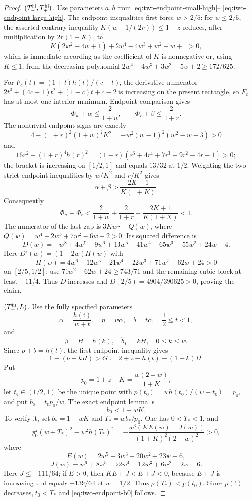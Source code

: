 \begin{proof}
\smallskip\noindent
\emph{$(T_+^{\rm hi},T_+^{\rm hi})$.}
Use parameters $a,b$ from \eqref{eq:two-endpoint-small-high}--
\eqref{eq:two-endpoint-large-high}.  The endpoint inequalities first force
$w>2/5$: for $w\le2/5$, the asserted contrary inequality
$K(w+1/(2r))\le1+z$ reduces, after multiplication by $2r(1+K)$, to
\[
 K(2w^2-4w+1)+2w^4-4w^3+w^2-w+1>0,
\]
which is immediate according as the coefficient of $K$ is nonnegative or,
using $K\le1$, from the decreasing polynomial
$2w^4-4w^3+3w^2-5w+2\ge172/625$.

For $F_c(t)=(1+t)h(t)/(c+t)$, the derivative numerator
$2t^3+(4c-1)t^2+(1-c)t+c-2$ is increasing on the present rectangle, so
$F_c$ has at most one interior minimum.  Endpoint comparison gives
\[
 \Phi_w+\alpha\le\frac2{1+w},\qquad
 \Phi_r+\beta\le\frac2{1+r}.
\]
The nontrivial endpoint signs are exactly
\[
 4-(1+r)^2(1+w)^2K^2
 =-w^2(w-1)^2(w^2-w-3)>0
\]
and
\[
 16r^2-(1+r)^4h(r)^2
 =(1-r)(r^5+4r^4+7r^3+9r^2-4r-1)>0;
\]
the bracket is increasing on $[1/2,1]$ and equals $13/32$ at $1/2$.
Weighting the two strict endpoint inequalities by $w/K^2$ and $r/K^2$
gives
\[
 \alpha+\beta>\frac{2K+1}{K(1+K)}.
\]
Consequently
\[
 \Phi_w+\Phi_r<\frac2{1+w}+\frac2{1+r}
 -\frac{2K+1}{K(1+K)}<1.
\]
The numerator of the last gap is $3Kwr-Q(w)$, where
$Q(w)=w^4-2w^3+7w^2-6w+2>0$.  Its squared difference is
\[
 D(w)=-w^8+4w^7-9w^6+13w^5-41w^4+65w^3-55w^2+24w-4.
\]
Here $D'(w)=(1-2w)H(w)$ with
\[
 H(w)=4w^6-12w^5+21w^4-22w^3+71w^2-62w+24>0
\]
on $[2/5,1/2]$; use
$71w^2-62w+24\ge743/71$ and the remaining cubic block at least $-11/4$.
Thus $D$ increases and $D(2/5)=4904/390625>0$, proving the claim.

\smallskip\noindent
\emph{$(T_+^{\rm hi},L)$.}
Use the fully specified parameters
\[
 \alpha=\frac{h(t)}{w+t},\quad p=w\alpha,\quad b=t\alpha,
 \quad\frac12\le t<1,
\]
and
\[
 \beta=H=h(k),\quad \widehat b_L=kH,\quad 0\le k\le w.
\]
Since $p+b=h(t)$, the first endpoint inequality gives
\begin{equation}
 1-(b+kH)>G:=2+z-h(t)-(1+k)H.
 \label{eq:two-endpoint-high-L-G}
\end{equation}
Put
\[
 p_0=1+z-K=\frac{w(2-w)}{1+K},
\]
let $t_0\in(1/2,1)$ be the unique point with
$p(t_0)=wh(t_0)/(w+t_0)=p_0$, and put $b_0=t_0p_0/w$.
The exact endpoint lemma is
\begin{equation}
 b_0<1-wK.
 \label{eq:two-endpoint-b0}
\end{equation}
To verify it, set $b_*=1-wK$ and $T_*=wb_*/p_0$.  One has $0<T_*<1$, and
\[
 p_0^2(w+T_*)^2-w^2h(T_*)^2
 =-\frac{w^3(KE(w)+J(w))}{(1+K)^2(2-w)^2}>0,
\]
where
\[
 E(w)=2w^5+3w^3-20w^2+23w-6,
\]
\[
 J(w)=w^6+8w^5-22w^4+12w^3+6w^2+2w-6.
\]
Here $J\le-111/64$; if $E>0$, then
$KE+J<E+J<0$, because $E+J$ is increasing and equals $-139/64$ at
$w=1/2$.  Thus $p(T_*)<p(t_0)$.  Since $p(t)$ decreases,
$t_0<T_*$ and \eqref{eq:two-endpoint-b0} follows.


\end{proof}
